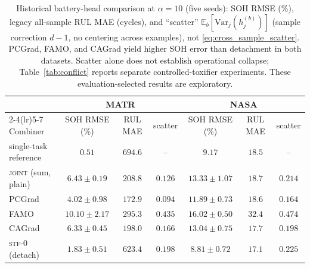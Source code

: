 \documentclass{article}
\begin{document}
\begin{table}[t]
\centering
\caption{Historical battery-head comparison at $\alpha=10$ (five seeds): SOH RMSE (\%), legacy all-sample RUL MAE (cycles), and ``scatter'' $\mathbb E_b[\mathrm{Var}_j(h_j^{(b)})]$ (sample correction $d-1$, no centering across examples), not \eqref{eq:cross_sample_scatter}. PCGrad, FAMO, and CAGrad yield higher SOH error than detachment in both datasets. Scatter alone does not establish operational collapse; Table~\ref{tab:conflict} reports separate controlled-toxifier experiments. These evaluation-selected results are exploratory.}
\label{tab:conflict_num}
\footnotesize
\setlength{\tabcolsep}{3.5pt}
\begin{tabular}{lcccccc}
\toprule
 & \multicolumn{3}{c}{MATR} & \multicolumn{3}{c}{NASA} \\
\cmidrule(lr){2-4}\cmidrule(lr){5-7}
Combiner & SOH RMSE (\%) & RUL MAE & scatter & SOH RMSE (\%) & RUL MAE & scatter \\
\midrule
single-task reference & $0.51$ & $694.6$ & -- & $9.17$ & $18.5$ & -- \\
\textsc{joint} (sum, plain) & $6.43\pm0.19$ & $208.8$ & $0.126$ & $13.33\pm1.07$ & $18.7$ & $0.214$ \\
PCGrad & $4.02\pm0.98$ & $172.9$ & $0.094$ & $11.89\pm0.73$ & $18.6$ & $0.164$ \\
FAMO & $10.10\pm2.17$ & $295.3$ & $0.435$ & $16.02\pm0.50$ & $32.4$ & $0.474$ \\
CAGrad & $6.33\pm0.45$ & $198.0$ & $0.166$ & $13.04\pm0.75$ & $17.7$ & $0.198$ \\
\midrule
\textsc{stf-0} (detach) & $1.83\pm0.51$ & $623.4$ & $0.198$ & $8.81\pm0.72$ & $17.1$ & $0.225$ \\
\bottomrule
\end{tabular}
\end{table}
\end{document}
